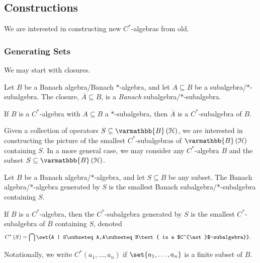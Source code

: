 \documentclass[10pt]{mypackage}
\renewcommand*{\mathbb}[1]{\varmathbb{#1}}
\newcommand{\B}{\mathbb{B}}
\begin{document}
\subsection{Constructions}%
We are interested in constructing new $C^{\ast}$-algebras from old.
\subsubsection{Generating Sets}%
We may start with closures.
\begin{lemma}
  Let $B$ be a Banach algebra/Banach $\ast$-algebra, and let $A\subseteq B$ be a subalgebra/$\ast$-subalgebra. The closure, $\overline{A}\subseteq B$, is a \textit{Banach} subalgebra/$\ast$-subalgebra.\newline

  If $B$ is a $C^{\ast}$-algebra with $A\subseteq B$ a $\ast$-subalgebra, then $\overline{A}$ is a $C^{\ast}$-subalgebra of $B$.
\end{lemma}
Given a collection of operators $S\subseteq \B\left(\mathcal{H}\right)$, we are interested in constructing the picture of the smallest $C^{\ast}$-subalgebras of $\B\left(\mathcal{H}\right)$ containing $S$. In a more general case, we may consider any $C^{\ast}$-algebra $B$ and the subset $S\subseteq \B\left(\mathcal{H}\right)$.
\begin{definition}
  Let $B$ be a Banach algebra/$\ast$-algebra, and let $S\subseteq B$ be any subset. The Banach algebra/$\ast$-algebra generated by $S$ is the smallest Banach subalgebra/$\ast$-subalgebra containing $S$.\newline

  If $B$ is a $C^{\ast}$-algebra, then the $C^{\ast}$-subalgebra generated by $S$ is the smallest $C^{\ast}$-subalgebra of $B$ containing $S$, denoted
  \begin{align*}
    C^{\ast}\left(S\right) &= \bigcap \set{A | S\subseteq A,A\subseteq B\text{ is a $C^{\ast}$-subalgebra}}.
  \end{align*}
\end{definition}
Notationally, we write $C^{\ast}\left(a_1,\dots,a_n\right)$ if $\set{a_1,\dots,a_n}$ is a finite subset of $B$.\newline
\end{document}
